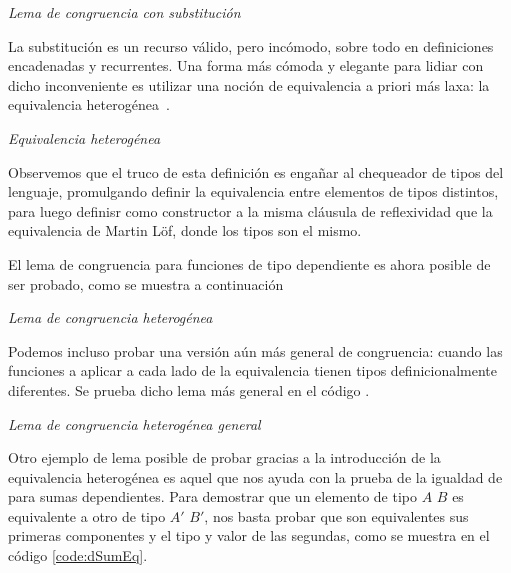 \begin{agdacode}{\it Lema de congruencia con substitución}\label{code:scong}

\end{agdacode}

La substitución es un recurso válido, pero incómodo, sobre todo en definiciones encadenadas y recurrentes.
Una forma más cómoda y elegante para lidiar con dicho inconveniente es utilizar una noción de equivalencia a priori más laxa: la equivalencia heterogénea~\cite{mcbride:motive}.

\begin{agdacode}{\it Equivalencia heterogénea} \label{code:heterequiv}

\end{agdacode}

Observemos que el truco de esta definición es engañar al chequeador de tipos del lenguaje, promulgando definir la equivalencia entre elementos de tipos distintos, para luego definisr como constructor a la misma cláusula de reflexividad que la equivalencia de Martin Löf, donde los tipos son el mismo.

El lema de congruencia para funciones de tipo dependiente es ahora posible de ser probado, como se muestra a continuación

\begin{agdacode}{\it Lema de congruencia heterogénea}

\end{agdacode}

Podemos incluso probar una versión aún más general de congruencia: cuando las funciones a aplicar a cada lado de la equivalencia tienen tipos definicionalmente diferentes. Se prueba dicho lema más general en el código . 

\begin{agdacode}\label{code:dcong}{\it Lema de congruencia heterogénea general}
  
\end{agdacode}

Otro ejemplo de lema posible de probar gracias a la introducción de la equivalencia heterogénea es aquel que nos ayuda con la prueba de la igualdad de para sumas dependientes. Para demostrar que un elemento de tipo \AgdaDatatype{$\Sigma$} $A$ $B$ es equivalente a otro de tipo \AgdaDatatype{$\Sigma$} $A'$ $B'$, nos basta probar que son equivalentes sus primeras componentes y el tipo y valor de las segundas, como se muestra en el código \ref{code:dSumEq}.


